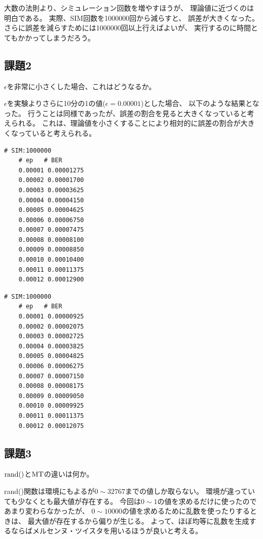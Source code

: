 \documentclass[12pt]{jarticle}
\begin{document}
大数の法則より、シミュレーション回数を増やすほうが、
理論値に近づくのは明白である。
実際、SIM回数を1000000回から減らすと、
誤差が大きくなった。
さらに誤差を減らすためには1000000回以上行えばよいが、
実行するのに時間とてもかかってしまうだろう。

\subsection{課題2}
\begin{shadebox}
    $\epsilon$を非常に小さくした場合、これはどうなるか。
\end{shadebox}

$\epsilon$を実験よりさらに10分の1の値($\epsilon=0.00001$)とした場合、
以下のような結果となった。
行うことは同様であったが、誤差の割合を見ると大きくなっていると考えられる。
これは、理論値を小さくすることにより相対的に誤差の割合が大きくなっていると考えられる。

\begin{lstlisting}[style=log,caption=rand()関数の結果(ep0.00001)]
    # SIM:1000000
    # ep   # BER
    0.00001 0.00001275
    0.00002 0.00001700
    0.00003 0.00003625
    0.00004 0.00004150
    0.00005 0.00004625
    0.00006 0.00006750
    0.00007 0.00007475
    0.00008 0.00008100
    0.00009 0.00008850
    0.00010 0.00010400
    0.00011 0.00011375
    0.00012 0.00012900
\end{lstlisting}

\begin{lstlisting}[style=log,caption=MTの結果(ep0.00001)]
    # SIM:1000000
    # ep   # BER
    0.00001 0.00000925
    0.00002 0.00002075
    0.00003 0.00002725
    0.00004 0.00003825
    0.00005 0.00004825
    0.00006 0.00006275
    0.00007 0.00007150
    0.00008 0.00008175
    0.00009 0.00009050
    0.00010 0.00009925
    0.00011 0.00011375
    0.00012 0.00012075    
\end{lstlisting}

\clearpage

\subsection{課題3}
\begin{shadebox}
    $\rm{rand()}$と$\rm{MT}$の違いは何か。
\end{shadebox}

rand()関数は環境にもよるが$0\sim 32767$までの値しか取らない。
環境が違っていても少なくとも最大値が存在する。
今回は$0\sim 1$の値を求めるだけに使ったのであまり変わらなかったが、
$0\sim 10000$の値を求めるために乱数を使ったりするときは、
最大値が存在するから偏りが生じる。
よって、ほぼ均等に乱数を生成するならばメルセンヌ・ツイスタを用いるほうが良いと考える。
\end{document}
